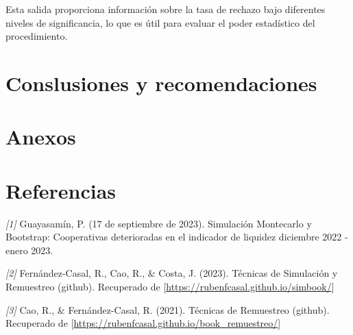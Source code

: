 \documentclass[
]{article}
\begin{document}
Esta salida proporciona información sobre la tasa de rechazo bajo
diferentes niveles de significancia, lo que es útil para evaluar el
poder estadístico del procedimiento.

\hypertarget{conslusiones-y-recomendaciones}{%
\section{Conslusiones y
recomendaciones}\label{conslusiones-y-recomendaciones}}

\hypertarget{anexos}{%
\section{Anexos}\label{anexos}}

\hypertarget{referencias}{%
\section{Referencias}\label{referencias}}

\emph{{[}1{]}} Guayasamín, P. (17 de septiembre de 2023). Simulación
Montecarlo y Bootstrap: Cooperativas deterioradas en el indicador de
liquidez diciembre 2022 - enero 2023.

\emph{{[}2{]}} Fernández-Casal, R., Cao, R., \& Costa, J. (2023).
Técnicas de Simulación y Remuestreo (github). Recuperado de
{[}\url{https://rubenfcasal.github.io/simbook/}{]}

\emph{{[}3{]}} Cao, R., \& Fernández-Casal, R. (2021). Técnicas de
Remuestreo (github). Recuperado de
{[}\url{https://rubenfcasal.github.io/book_remuestreo/}{]}
\end{document}
